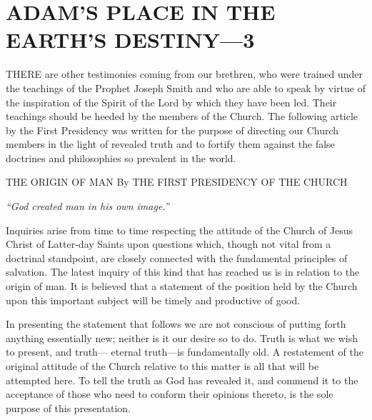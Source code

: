 \chapter{ADAM'S PLACE IN THE EARTH'S DESTINY—3}

THERE are other testimonies coming from our brethren, who were trained under the
teachings of the Prophet Joseph Smith and who are able to speak by virtue of the inspiration
of the Spirit of the Lord by which they have been led. Their teachings should be heeded by
the members of the Church. The following article by the First Presidency was written for the
purpose of directing our Church members in the light of revealed truth and to fortify them
against the false doctrines and philosophies so prevalent in the world.

THE ORIGIN OF MAN By THE FIRST PRESIDENCY OF THE CHURCH

\textit{``God created man in his own image.''}

Inquiries arise from time to time respecting the attitude of the Church of Jesus Christ of
Latter-day Saints upon questions which, though not vital from a doctrinal standpoint, are
closely connected with the fundamental principles of salvation. The latest inquiry of this kind
that has reached us is in relation to the origin of man. It is believed that a statement of the
position held by the Church upon this important subject will be timely and productive of
good.

In presenting the statement that follows we are not conscious of putting forth anything
essentially new; neither is it our desire so to do. Truth is what we wish to present, and truth—
eternal truth—is fundamentally old. A restatement of the original attitude of the Church
relative to this matter is all that will be attempted here. To tell the truth as God has revealed
it, and commend it to the acceptance of those who need to conform their opinions thereto, is
the sole purpose of this presentation.

